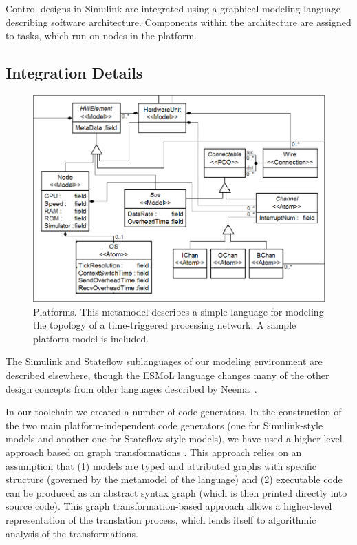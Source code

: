 
Control designs in Simulink are integrated using a graphical modeling language describing software architecture.  Components within the architecture are assigned to tasks, which run on nodes in the platform.  

\subsection{Integration Details}

\begin{figure}
	\centering
	\includegraphics[width=0.75\columnwidth]{diagrams/platform.png}
	\caption{Platforms. This metamodel describes a simple language for modeling the topology of a time-triggered processing network.  A sample platform model is included.}
	\label{fig:platform}
\end{figure}

The Simulink and Stateflow sublanguages of our modeling environment are described elsewhere, though the ESMoL language changes many of the other design concepts from older languages described by Neema~\cite{KS:ISIS-04-505}.

In our toolchain we created a number of code generators. In the construction of the two main platform-independent code generators (one for Simulink-style models and another one for Stateflow-style models), we have used a higher-level approach based on graph transformations \cite{isis:great}. This approach relies on an assumption that (1) models are typed and attributed graphs with specific structure (governed by the metamodel of the language) and (2) executable code can be produced as an abstract syntax graph (which is then printed directly into source code). This graph transformation-based approach allows a higher-level representation of the translation process, which lends itself to algorithmic analysis of the transformations.

